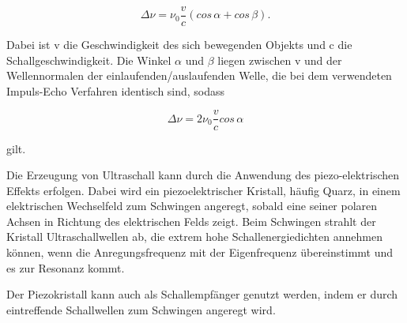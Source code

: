 \begin{equation}
        \Delta\nu = \nu_0 \frac{v}{c} (cos\,\alpha + cos\,\beta).
\end{equation}

\noindent
Dabei ist v die Geschwindigkeit des sich bewegenden Objekts und c die Schallgeschwindigkeit.
Die Winkel $\alpha$ und $\beta$ liegen zwischen v und der Wellennormalen der einlaufenden/auslaufenden Welle,
die bei dem verwendeten Impuls-Echo Verfahren identisch sind, sodass

\begin{equation}
        \Delta\nu = 2\nu_0 \frac{v}{c} cos\,\alpha
        \label{eqn:dv}
\end{equation}

\noindent
gilt.

\noindent
Die Erzeugung von Ultraschall kann durch die Anwendung des piezo-elektrischen Effekts erfolgen.
Dabei wird ein piezoelektrischer Kristall, häufig Quarz, in einem elektrischen Wechselfeld zum Schwingen angeregt,
sobald eine seiner polaren Achsen in Richtung des elektrischen Felds zeigt.
Beim Schwingen strahlt der Kristall Ultraschallwellen ab, die extrem hohe Schallenergiedichten annehmen können,
wenn die Anregungsfrequenz mit der Eigenfrequenz übereinstimmt und es zur Resonanz kommt.

\noindent
Der Piezokristall kann auch als Schallempfänger genutzt werden, indem er durch eintreffende Schallwellen zum Schwingen angeregt wird.
